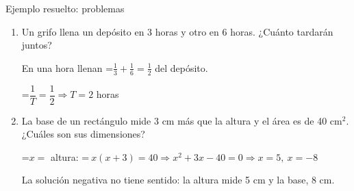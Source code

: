\documentclass[11pt,a4paper]{article}
\newcommand{\fmm}[1]{\setbox0=\hbox{$#1$}\ifdim\wd0>\linewidth\fmdisp{#1}\else\mbox{\box0}\fi}
\newcommand{\fmdisp}[1]{\[\setbox2=\hbox{$\displaystyle #1$}\ifdim\wd2>\linewidth\resizebox{\linewidth}{!}{\box2}\else\box2\fi\]}
\begin{document}
\begin{fmex}{Ejemplo resuelto: problemas}
\begin{enumerate}[label=\textbf{\arabic*.},leftmargin=*]
\item Un grifo llena un depósito en 3 horas y otro en 6 horas. ¿Cuánto tardarán juntos?

En una hora llenan \fmm{\frac13+\frac16=\frac12} del depósito.

\fmm{\dfrac1T=\dfrac12\Rightarrow T=2} horas
\item La base de un rectángulo mide 3 cm más que la altura y el área es de 40 cm$^2$. ¿Cuáles son sus dimensiones?

\fmm{x=} altura: \fmm{\ x(x+3)=40\Rightarrow x^2+3x-40=0\Rightarrow x=5,\ x=-8}

La solución negativa no tiene sentido: la altura mide 5 cm y la base, 8 cm.
\end{enumerate}
\end{fmex}

  
\end{document}
